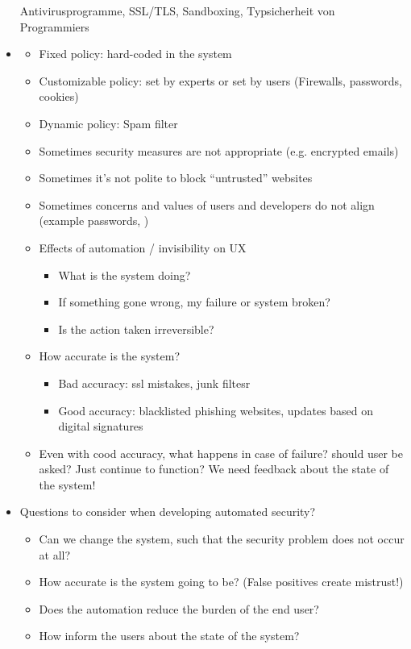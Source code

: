 \documentclass[a4paper,12pt]{scrartcl}
\begin{document}
\begin{itemize}
		Antivirusprogramme, SSL/TLS, Sandboxing, Typsicherheit von Programmiers
	\item
		\begin{itemize}
			\item
				Fixed policy: hard-coded in the system
			\item
				Customizable policy: set by experts or set by users (Firewalls, passwords, cookies)
			\item
				Dynamic policy: Spam filter
			\item
				Sometimes security measures are not appropriate (e.g. encrypted emails)
			\item
				Sometimes it's not polite to block \enquote{untrusted} websites
			\item
				Sometimes concerns and values of users and developers do not align (example passwords, )
			\item
				Effects of automation / invisibility on UX
				\begin{itemize}
					\item
						What is the system doing?
					\item
						If something gone wrong, my failure or system broken?
					\item
						Is the action taken irreversible?
				\end{itemize}
			\item
				How accurate is the system?
				\begin{itemize}
					\item
						Bad accuracy: ssl mistakes, junk filtesr
					\item
						Good accuracy: blacklisted phishing websites, updates based on digital signatures
				\end{itemize}
			\item
				Even with cood accuracy, what happens in case of failure? should user be asked? Just continue to function? We need feedback about the state of the system!
		\end{itemize}
	\item
		Questions to consider when developing automated security?
		\begin{itemize}
			\item
				Can we change the system, such that the security problem does not occur at all?
			\item
				How accurate is the system going to be? (False positives create mistrust!)
			\item
				Does the automation reduce the burden of the end user?
			\item
				How inform the users about the state of the system?
		\end{itemize}
\end{itemize}
\end{document}
